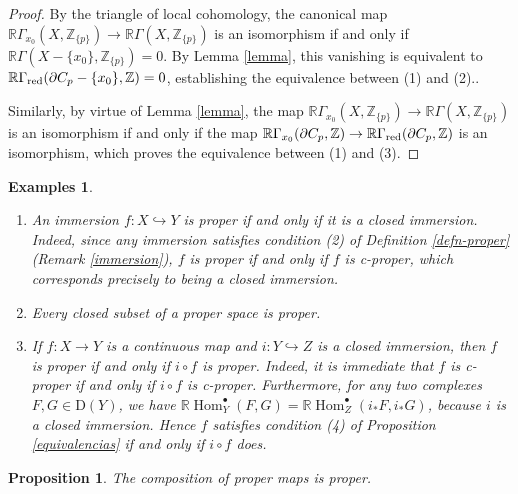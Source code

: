 \documentclass[amssymb,amscd,11pt,20pt]{amsart}
\newcommand{\ZZ}{{\mathbb Z}}
\newcommand{\RR}{\mathbb R}
\newcommand{\0}{\mathbf 0}
\DeclareMathOperator{\Hom}{{Hom}}
\newcommand{\pun}{{\scriptscriptstyle \bullet}}
\theoremstyle{plain}
\newtheorem{prop}[thm]{Proposition}
\newtheorem*{exs}{Examples}
\numberwithin{equation}{thm}
\begin{document}
\begin{proof} By the triangle of local cohomology, the canonical map  $\RR\Gamma_{x_0}(X,\ZZ_{\{p\}}) \to \RR\Gamma (X,\ZZ_{\{p\}})$ is an isomorphism if and only if   $\RR\Gamma(X-\{x_0\},\ZZ_{\{p\}})=0 $. By Lemma \ref{lemma}, this vanishing  is equivalent to  $\RR\Gamma_{\text{\rm red}}( \partial C_p-\{x_0\},\ZZ)=0$, establishing the equivalence between (1) and (2)..

Similarly, by virtue of Lemma \ref{lemma}, the map $\mathbb{R}\Gamma_{x_0}(X,\mathbb{Z}_{\{p\}}) \to \mathbb{R}\Gamma(X,\mathbb{Z}_{\{p\}})$ is an isomorphism if and only if the map $\mathbb{R}\Gamma_{x_0}(\partial C_p,\mathbb{Z}) \to \mathbb{R}\Gamma_{\text{\rm red}}(\partial C_p,\mathbb{Z})$ is an isomorphism, which proves the equivalence between (1) and (3).
\end{proof}

\begin{exs}{\rm \begin{enumerate}\item An immersion $f\colon X\hookrightarrow Y$ is proper if and only if it is a closed immersion.  Indeed, since any immersion satisfies condition (2) of Definition \ref{defn-proper} (Remark \ref{immersion}), $f$ is proper if and only if $f$ is c-proper, which corresponds precisely to being a closed immersion.
\item Every closed subset of a proper space is  proper.
\item If $f\colon X\to Y$ is a continuous map and $i\colon Y\hookrightarrow Z$ is a closed immersion, 
then $f$ is proper if and only if $i\circ f$ is proper.  Indeed, it is immediate that $f$ is c-proper if and only if $i\circ f$ is c-proper. Furthermore, for any two complexes $F,G\in \mathrm{D}(Y)$, we have $\RR\Hom_Y^\pun(F,G) = \RR\Hom_Z^\pun(i_*F,i_*G)$, because $i$ is a closed immersion. Hence $f$ satisfies condition (4) of Proposition \ref{equivalencias} if and only if $i\circ f$ does.
\end{enumerate}}
\end{exs}




\begin{prop}\label{composition} The composition of proper maps is proper.
\end{prop}
\end{document}
